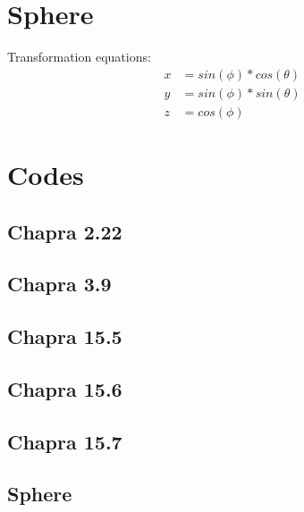\documentclass{article}
\begin{document}
\section{Sphere}
Transformation equations:
\begin{align*}
x&=sin(\phi)*cos(\theta)\\
y&=sin(\phi)*sin(\theta)\\
z&=cos(\phi)
\end{align*}
\pagebreak

\appendix
\section{Codes}



\lstset{style=python103, language=python} 

\subsection{Chapra 2.22}

\pagebreak

\subsection{Chapra 3.9}

\pagebreak

\subsection{Chapra 15.5}

\pagebreak

\subsection{Chapra 15.6}

\pagebreak

\subsection{Chapra 15.7}

\pagebreak

\subsection{Sphere}

\end{document}
